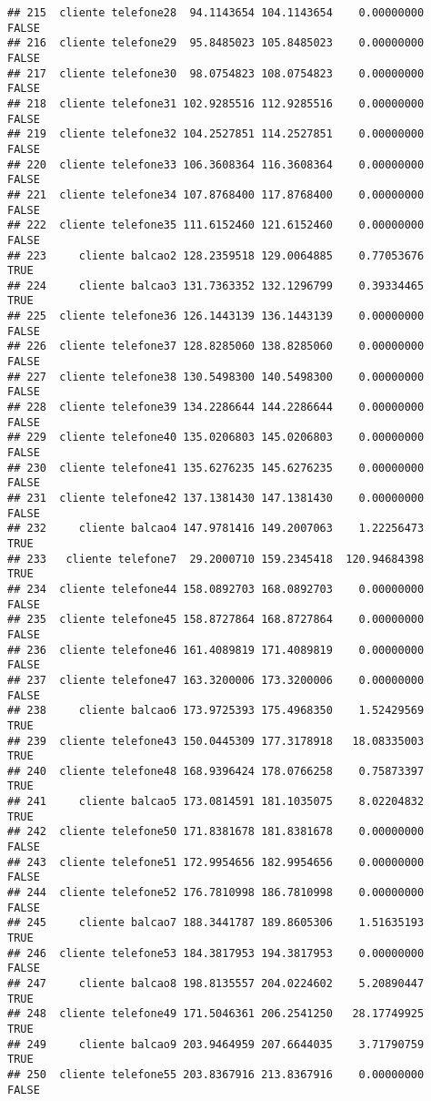 \documentclass[
]{article}
\begin{document}
\begin{verbatim}
## 215  cliente telefone28  94.1143654 104.1143654    0.00000000    FALSE
## 216  cliente telefone29  95.8485023 105.8485023    0.00000000    FALSE
## 217  cliente telefone30  98.0754823 108.0754823    0.00000000    FALSE
## 218  cliente telefone31 102.9285516 112.9285516    0.00000000    FALSE
## 219  cliente telefone32 104.2527851 114.2527851    0.00000000    FALSE
## 220  cliente telefone33 106.3608364 116.3608364    0.00000000    FALSE
## 221  cliente telefone34 107.8768400 117.8768400    0.00000000    FALSE
## 222  cliente telefone35 111.6152460 121.6152460    0.00000000    FALSE
## 223     cliente balcao2 128.2359518 129.0064885    0.77053676     TRUE
## 224     cliente balcao3 131.7363352 132.1296799    0.39334465     TRUE
## 225  cliente telefone36 126.1443139 136.1443139    0.00000000    FALSE
## 226  cliente telefone37 128.8285060 138.8285060    0.00000000    FALSE
## 227  cliente telefone38 130.5498300 140.5498300    0.00000000    FALSE
## 228  cliente telefone39 134.2286644 144.2286644    0.00000000    FALSE
## 229  cliente telefone40 135.0206803 145.0206803    0.00000000    FALSE
## 230  cliente telefone41 135.6276235 145.6276235    0.00000000    FALSE
## 231  cliente telefone42 137.1381430 147.1381430    0.00000000    FALSE
## 232     cliente balcao4 147.9781416 149.2007063    1.22256473     TRUE
## 233   cliente telefone7  29.2000710 159.2345418  120.94684398     TRUE
## 234  cliente telefone44 158.0892703 168.0892703    0.00000000    FALSE
## 235  cliente telefone45 158.8727864 168.8727864    0.00000000    FALSE
## 236  cliente telefone46 161.4089819 171.4089819    0.00000000    FALSE
## 237  cliente telefone47 163.3200006 173.3200006    0.00000000    FALSE
## 238     cliente balcao6 173.9725393 175.4968350    1.52429569     TRUE
## 239  cliente telefone43 150.0445309 177.3178918   18.08335003     TRUE
## 240  cliente telefone48 168.9396424 178.0766258    0.75873397     TRUE
## 241     cliente balcao5 173.0814591 181.1035075    8.02204832     TRUE
## 242  cliente telefone50 171.8381678 181.8381678    0.00000000    FALSE
## 243  cliente telefone51 172.9954656 182.9954656    0.00000000    FALSE
## 244  cliente telefone52 176.7810998 186.7810998    0.00000000    FALSE
## 245     cliente balcao7 188.3441787 189.8605306    1.51635193     TRUE
## 246  cliente telefone53 184.3817953 194.3817953    0.00000000    FALSE
## 247     cliente balcao8 198.8135557 204.0224602    5.20890447     TRUE
## 248  cliente telefone49 171.5046361 206.2541250   28.17749925     TRUE
## 249     cliente balcao9 203.9464959 207.6644035    3.71790759     TRUE
## 250  cliente telefone55 203.8367916 213.8367916    0.00000000    FALSE

\end{verbatim}
\end{document}
